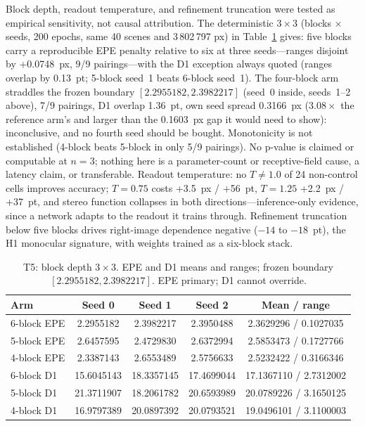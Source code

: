 \documentclass[conference]{IEEEtran}
\begin{document}
Block depth, readout temperature, and refinement truncation were tested as empirical sensitivity, not causal attribution. The deterministic $3\times3$ (blocks $\times$ seeds, 200 epochs, same 40 scenes and 3\,802\,797 px) in Table~\ref{tab:t5} gives: five blocks carry a reproducible EPE penalty relative to six at three seeds---ranges disjoint by +0.0748~px, 9/9 pairings---with the D1 exception always quoted (ranges overlap by 0.13~pt; 5-block seed~1 beats 6-block seed~1). The four-block arm straddles the frozen boundary $[2.2955182, 2.3982217]$ (seed~0 inside, seeds~1--2 above), 7/9 pairings, D1 overlap 1.36~pt, own seed spread 0.3166~px ($3.08\times$ the reference arm's and larger than the 0.1603~px gap it would need to show): inconclusive, and no fourth seed should be bought. Monotonicity is not established (4-block beats 5-block in only 5/9 pairings). No p-value is claimed or computable at $n=3$; nothing here is a parameter-count or receptive-field cause, a latency claim, or transferable. Readout temperature: no $T \ne 1.0$ of 24 non-control cells improves accuracy; $T=0.75$ costs +3.5~px / +56~pt, $T=1.25$ +2.2~px / +37~pt, and stereo function collapses in both directions---inference-only evidence, since a network adapts to the readout it trains through. Refinement truncation below five blocks drives right-image dependence negative ($-14$ to $-18$~pt), the H1 monocular signature, with weights trained as a six-block stack.

\begin{table}[t]
\centering
\caption{T5: block depth $3\times3$. EPE and D1 means and ranges; frozen boundary $[2.2955182, 2.3982217]$. EPE primary; D1 cannot override.}
\label{tab:t5}
\begin{tabular}{lcccc}
\toprule
Arm & Seed 0 & Seed 1 & Seed 2 & Mean / range \\
\midrule
6-block EPE & 2.2955182 & 2.3982217 & 2.3950488 & 2.3629296 / 0.1027035 \\
5-block EPE & 2.6457595 & 2.4729830 & 2.6372994 & 2.5853473 / 0.1727766 \\
4-block EPE & 2.3387143 & 2.6553489 & 2.5756633 & 2.5232422 / 0.3166346 \\
6-block D1 & 15.6045143 & 18.3357145 & 17.4699044 & 17.1367110 / 2.7312002 \\
5-block D1 & 21.3711907 & 18.2061782 & 20.6593989 & 20.0789226 / 3.1650125 \\
4-block D1 & 16.9797389 & 20.0897392 & 20.0793521 & 19.0496101 / 3.1100003 \\
\bottomrule
\end{tabular}
\end{table}
\end{document}
